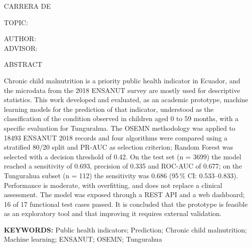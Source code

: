 \clearpage
\begin{center}
  \Universidad\par\vspace{2mm}
  \Facultad\par\vspace{2mm}
  CARRERA DE \Carrera
\end{center}
\vspace{2mm}
\noindent\hspace*{\parindent}TOPIC:\\
\noindent\TemaIngles\par
\vspace{2mm}
\begin{center}
  AUTHOR: \Autor\\
  ADVISOR: \Tutor
\end{center}
\vspace{4mm}
\begin{center}ABSTRACT\end{center}

Chronic child malnutrition is a priority public health indicator in Ecuador, and the microdata from the 2018 ENSANUT survey are mostly used for descriptive statistics. This work developed and evaluated, as an academic prototype, machine learning models for the prediction of that indicator, understood as the classification of the condition observed in children aged 0 to 59 months, with a specific evaluation for Tungurahua. The OSEMN methodology was applied to \num{18493} ENSANUT 2018 records and four algorithms were compared using a stratified 80/20 split and PR-AUC as selection criterion; Random Forest was selected with a decision threshold of 0.42. On the test set (n = \num{3699}) the model reached a sensitivity of 0.693, precision of 0.335 and ROC-AUC of 0.677; on the Tungurahua subset (n = 112) the sensitivity was 0.686 (95\,\% CI: 0.533–0.833). Performance is moderate, with overfitting, and does not replace a clinical assessment. The model was exposed through a REST API and a web dashboard; 16 of 17 functional test cases passed. It is concluded that the prototype is feasible as an exploratory tool and that improving it requires external validation.

\noindent\textbf{KEYWORDS:} Public health indicators; Prediction; Chronic child malnutrition; Machine learning; ENSANUT; OSEMN; Tungurahua
